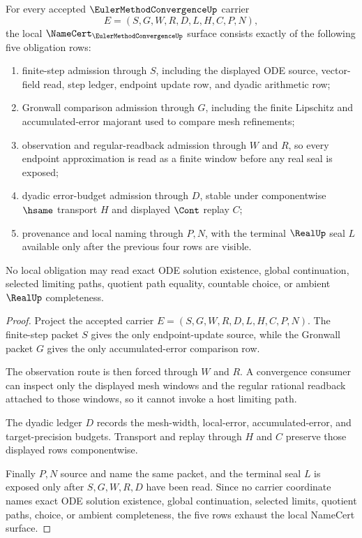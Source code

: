 \begin{theorem}
\label{thm:euler-method-convergence-namecert-obligations}
For every accepted $\EulerMethodConvergenceUp$ carrier
$$
E=(S,G,W,R,D,L,H,C,P,N),
$$
the local $\NameCert_{\EulerMethodConvergenceUp}$ surface consists exactly of the following five obligation rows:
\begin{enumerate}
\item finite-step admission through $S$, including the displayed ODE source, vector-field read, step ledger, endpoint update row, and dyadic arithmetic row;
\item Gronwall comparison admission through $G$, including the finite Lipschitz and accumulated-error majorant used to compare mesh refinements;
\item observation and regular-readback admission through $W$ and $R$, so every endpoint approximation is read as a finite window before any real seal is exposed;
\item dyadic error-budget admission through $D$, stable under componentwise $\hsame$ transport $H$ and displayed $\Cont$ replay $C$;
\item provenance and local naming through $P,N$, with the terminal $\RealUp$ seal $L$ available only after the previous four rows are visible.
\end{enumerate}
No local obligation may read exact ODE solution existence, global continuation, selected limiting paths, quotient path equality, countable choice, or ambient $\RealUp$ completeness.
\end{theorem}
\begin{proof}
Project the accepted carrier $E=(S,G,W,R,D,L,H,C,P,N)$. The finite-step packet $S$ gives the only endpoint-update source, while the Gronwall packet $G$ gives the only accumulated-error comparison row.

The observation route is then forced through $W$ and $R$. A convergence consumer can inspect only the displayed mesh windows and the regular rational readback attached to those windows, so it cannot invoke a host limiting path.

The dyadic ledger $D$ records the mesh-width, local-error, accumulated-error, and target-precision budgets. Transport and replay through $H$ and $C$ preserve those displayed rows componentwise.

Finally $P,N$ source and name the same packet, and the terminal seal $L$ is exposed only after $S,G,W,R,D$ have been read. Since no carrier coordinate names exact ODE solution existence, global continuation, selected limits, quotient paths, choice, or ambient completeness, the five rows exhaust the local NameCert surface.
\end{proof}


